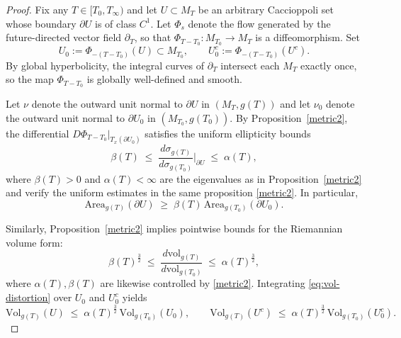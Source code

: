 \documentclass{amsart}
\begin{document}
\begin{proof}
Fix any $T\in[T_{0},T_{\infty})$ and let $U\subset M_{T}$ be an arbitrary Caccioppoli
set whose boundary $\partial U$ is of class $C^{1}$.  
Let $\Phi_{s}$ denote the flow generated by the future-directed vector 
field $\partial_{T}$, so that 
\(
\Phi_{T-T_{0}}\colon M_{T_{0}}\to M_{T}
\)
is a diffeomorphism.
Set
\[
      U_{0}:=\Phi_{-(T-T_{0})}(U)\subset M_{T_{0}},
      \qquad 
      U^{c}_{0}:=\Phi_{-(T-T_{0})}(U^{c}).
\]
By global hyperbolicity, the integral curves of $\partial_{T}$
intersect each $M_{T}$ exactly once, so the map
$\Phi_{T-T_{0}}$ is globally well-defined and smooth.

\medskip
\noindent Let $\nu$ denote the outward unit normal to $\partial U$ in $(M_{T},g(T))$ and 
let $\nu_{0}$ denote the outward unit normal to $\partial U_{0}$ 
in $(M_{T_{0}},g(T_{0}))$.  
By Proposition~\ref{metric2}, the differential 
$D\Phi_{T-T_{0}}|_{T_{x}(\partial U_{0})}$ satisfies the uniform
ellipticity bounds
\begin{equation}\label{eq:area-distortion}
\beta(T)
\;\le\;
\frac{d\sigma_{g(T)}}{d\sigma_{g(T_{0})}}
\Big|_{\partial U}
\;\le\;
\alpha(T),
\end{equation}
where $\beta(T)>0$ and $\alpha(T)<\infty$ are the 
eigenvalues as in Proposition~\ref{metric2} and verify the uniform estimates in the same proposition \ref{metric2}.
In particular,
\begin{equation}\label{eq:area-ineq}
   \mathrm{Area}_{g(T)}(\partial U)
   \;\ge\;
   \beta(T)\,
   \mathrm{Area}_{g(T_{0})}(\partial U_{0}).
\end{equation}

\medskip
\noindent Similarly, Proposition~\ref{metric2} implies pointwise bounds for the 
Riemannian volume form:
\begin{equation}\label{eq:vol-distortion}
     \beta(T)^{\frac{3}{2}}
     \;\le\;
     \frac{d\mathrm{vol}_{g(T)}}{d\mathrm{vol}_{g(T_{0})}}
     \;\le\;
     \alpha(T)^{\frac{3}{2}},
\end{equation}
where $\alpha(T),\beta(T)$ are likewise controlled 
by \ref{metric2}.  
Integrating \eqref{eq:vol-distortion} over $U_{0}$ and $U^{c}_{0}$ yields
\begin{equation}\label{eq:vol-ineq}
   \mathrm{Vol}_{g(T)}(U)
       \;\le\; \alpha(T)^{\frac{3}{2}}\,\mathrm{Vol}_{g(T_{0})}(U_{0}), 
   \qquad
   \mathrm{Vol}_{g(T)}(U^{c})
       \;\le\; \alpha(T)^{\frac{3}{2}}\,\mathrm{Vol}_{g(T_{0})}(U^{c}_{0}).
\end{equation}


\end{proof}
\end{document}
